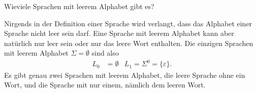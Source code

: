 Wieviele Sprachen mit leerem Alphabet gibt es?


\begin{loesung}
Nirgends in der Definition einer Sprache wird verlangt, dass das
Alphabet einer Sprache nicht leer sein darf. Eine Sprache mit leerem
Alphabet kann aber natürlich nur leer sein oder nur das leere Wort
enthalten. Die einzigen Sprachen mit leerem Alphabet $\Sigma=\emptyset$
sind also
\begin{align*}
L_0&=\emptyset& L_1=\Sigma^0=\{\varepsilon\}.
\end{align*}
Es gibt genau zwei Sprachen mit leerem Alphabet, die leere Sprache ohne
ein Wort, und die Sprache mit nur einem, nämlich dem leeren Wort.
\end{loesung}
